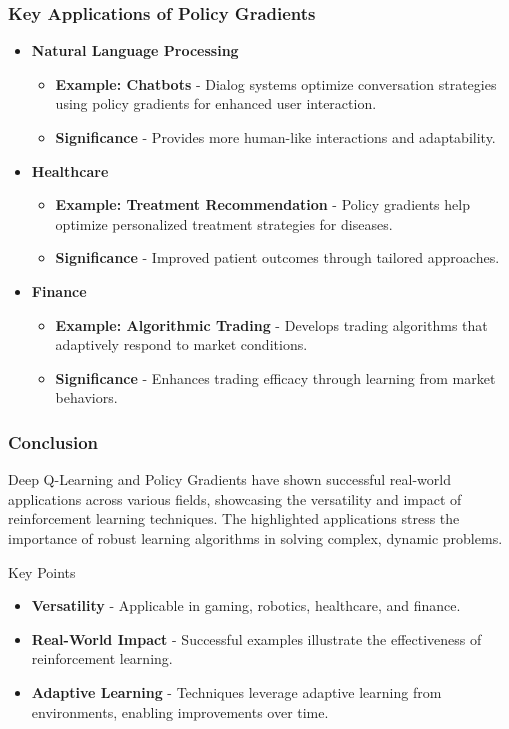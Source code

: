 \documentclass[aspectratio=169]{beamer}
\begin{document}
\begin{frame}[fragile]
    \frametitle{Key Applications of Policy Gradients}
    \begin{itemize}
        \item \textbf{Natural Language Processing}
        \begin{itemize}
            \item \textbf{Example: Chatbots} - Dialog systems optimize conversation strategies using policy gradients for enhanced user interaction.
            \item \textbf{Significance} - Provides more human-like interactions and adaptability.
        \end{itemize}
        
        \item \textbf{Healthcare}
        \begin{itemize}
            \item \textbf{Example: Treatment Recommendation} - Policy gradients help optimize personalized treatment strategies for diseases.
            \item \textbf{Significance} - Improved patient outcomes through tailored approaches.
        \end{itemize}
        
        \item \textbf{Finance}
        \begin{itemize}
            \item \textbf{Example: Algorithmic Trading} - Develops trading algorithms that adaptively respond to market conditions.
            \item \textbf{Significance} - Enhances trading efficacy through learning from market behaviors.
        \end{itemize}
    \end{itemize}
\end{frame}

\begin{frame}[fragile]
    \frametitle{Conclusion}
    Deep Q-Learning and Policy Gradients have shown successful real-world applications across various fields, showcasing the versatility and impact of reinforcement learning techniques. The highlighted applications stress the importance of robust learning algorithms in solving complex, dynamic problems.
    
    \begin{block}{Key Points}
        \begin{itemize}
            \item \textbf{Versatility} - Applicable in gaming, robotics, healthcare, and finance.
            \item \textbf{Real-World Impact} - Successful examples illustrate the effectiveness of reinforcement learning.
            \item \textbf{Adaptive Learning} - Techniques leverage adaptive learning from environments, enabling improvements over time.
        \end{itemize}
    \end{block}
\end{frame}
\end{document}
